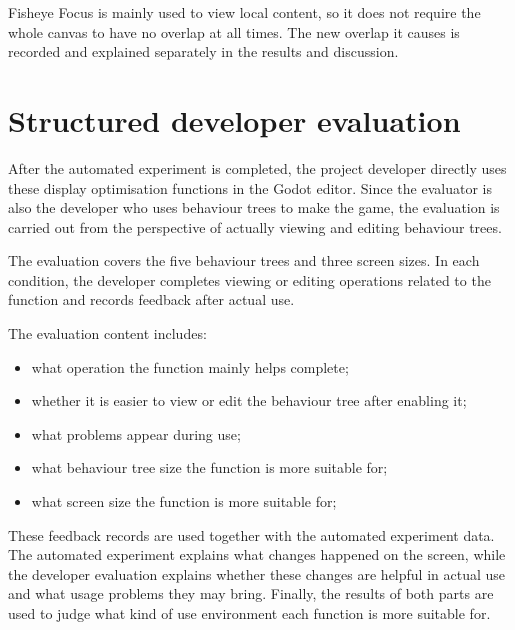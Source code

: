 \documentclass[11pt,a4paper,oneside,extrafontsizes]{memoir}
\begin{document}
Fisheye Focus is mainly used to view local content, so it does not require the whole canvas to have no overlap at all times. The new overlap it causes is recorded and explained separately in the results and discussion.

\section{Structured developer evaluation}

After the automated experiment is completed, the project developer directly uses these display optimisation functions in the Godot editor. Since the evaluator is also the developer who uses behaviour trees to make the game, the evaluation is carried out from the perspective of actually viewing and editing behaviour trees.

The evaluation covers the five behaviour trees and three screen sizes. In each condition, the developer completes viewing or editing operations related to the function and records feedback after actual use.

The evaluation content includes:

\begin{itemize}[leftmargin=*]
\item what operation the function mainly helps complete;
\end{itemize}

\begin{itemize}[leftmargin=*]
\item whether it is easier to view or edit the behaviour tree after enabling it;
\end{itemize}

\begin{itemize}[leftmargin=*]
\item what problems appear during use;
\end{itemize}

\begin{itemize}[leftmargin=*]
\item what behaviour tree size the function is more suitable for;
\end{itemize}

\begin{itemize}[leftmargin=*]
\item what screen size the function is more suitable for;
\end{itemize}

These feedback records are used together with the automated experiment data. The automated experiment explains what changes happened on the screen, while the developer evaluation explains whether these changes are helpful in actual use and what usage problems they may bring. Finally, the results of both parts are used to judge what kind of use environment each function is more suitable for.
\end{document}
